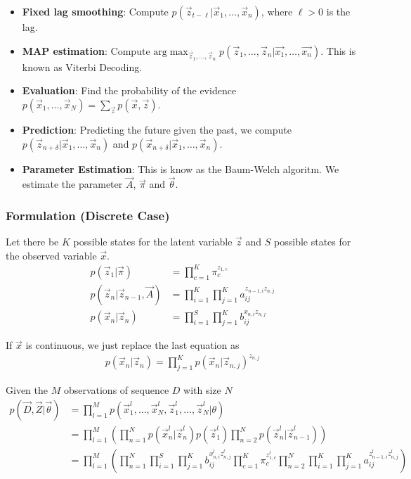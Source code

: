 \documentclass[12pt,twoside]{article}
\begin{document}
\begin{enumerate}
\begin{itemize}
			\item \textbf{Fixed lag smoothing}: Compute  $p(\vec{z}_{t-\ell} \vert \vec{x}_1,\ldots, \vec{x}_n)$, where  $\ell >0$ is the lag. 
			
			\item \textbf{MAP estimation}: Compute $\text{arg} \max_{\vec{z}_1,\ldots, \vec{z}_n} p(\vec{z}_{1},\ldots,\vec{z}_{n} \vert \vec{x_1}, \ldots, \vec{x_n}) $. This is known as Viterbi Decoding.
			
			\item \textbf{Evaluation}: Find the probability of the evidence $p(\vec{x}_1,\ldots, \vec{x}_N)= \sum_{\vec{z}} p(\vec{x}, \vec{z})$.			
			
			\item \textbf{Prediction}: Predicting the future given the past, we compute $p(\vec{z}_{n+\delta}\vert \vec{x}_1, \ldots, \vec{x}_n)$ and $p(\vec{x}_{n+\delta}\vert \vec{x}_1, \ldots, \vec{x}_n)$.
			
			\item \textbf{Parameter Estimation}: This is know as the Baum-Welch algoritm. We estimate the parameter $\vec{A}$, $\vec{\pi}$ and $\vec{\theta}$.
		\end{itemize}

\end{enumerate}


\subsubsection{Formulation (Discrete Case)}
Let there be $K$ possible states for the latent variable $\vec{z}$ and $S$ possible states for the observed variable $\vec{x}$.
\begin{align*}
	p(\vec{z}_1\vert \vec{\pi}) 						&= \prod_{c=1}^K \pi_c^{z_{1,c}}\\
	p(\vec{z}_n \vert \vec{z}_{n-1}, \vec{A})	&= \prod_{i=1}^K \prod_{j=1}^K a_{ij}^{z_{n-1, i}z_{n, j}}\\
	p(\vec{x}_n \vert \vec{z}_n)					 	&= \prod_{i=1}^S \prod_{j=1}^K b_{ij}^{x_{n,i}z_{n,j}}
\end{align*}

If $\vec{x}$ is continuous, we just replace the last equation as
\begin{align*}
	p(\vec{x}_n \vert \vec{z}_n)	 = \prod_{j=1}^K p(\vec{x}_n \vert \vec{z}_{n, j})^{z_{n,j}}
\end{align*}

Given the $M$ observations of sequence $D$ with size $N$
\begin{align*}
	p(\vec{D}, \vec{Z}\vert \vec{\theta})
	& =\prod_{l=1}^M p(\vec{x}_1^l,\ldots, \vec{x}_N^l, \vec{z}_1^l,\ldots, \vec{z}_N^l \vert \theta)\\
	& = \prod_{l=1}^M \left(\prod_{n=1}^N p(\vec{x}_n^l \vert \vec{z}_n^l) p(\vec{z}_1^l)\prod_{n=2}^N p(\vec{z}_n^l \vert \vec{z}_{n-1}^l) \right)\\
	& = \prod_{l=1}^M \left(\prod_{n=1}^N \prod_{i=1}^S \prod_{j=1}^K b_{ij}^{x_{n,i}^lz_{n,j}^l} \prod_{c=1}^K \pi_c^{z_{1,c}^l}\prod_{n=2}^N \prod_{i=1}^K \prod_{j=1}^K a_{ij}^{z_{n-1, i}^l z_{n, j}^l} \right)\\
\end{align*}
\end{document}
